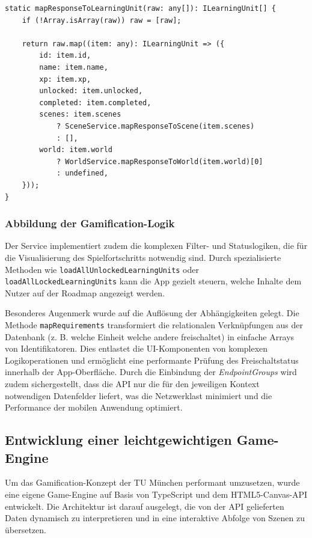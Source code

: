 \begin{verbatim}
static mapResponseToLearningUnit(raw: any[]): ILearningUnit[] {
    if (!Array.isArray(raw)) raw = [raw];

    return raw.map((item: any): ILearningUnit => ({
        id: item.id,
        name: item.name,
        xp: item.xp,
        unlocked: item.unlocked,
        completed: item.completed,
        scenes: item.scenes 
            ? SceneService.mapResponseToScene(item.scenes) 
            : [],
        world: item.world 
            ? WorldService.mapResponseToWorld(item.world)[0] 
            : undefined,
    }));
}
\end{verbatim}

\subsubsection{Abbildung der Gamification-Logik}
Der Service implementiert zudem die komplexen Filter- und Statuslogiken, die für die Visualisierung des Spielfortschritts notwendig sind. Durch spezialisierte Methoden wie 
\texttt{loadAll\-Unlocked\-Learning\-Units} oder \texttt{loadAllLockedLearningUnits} kann die App gezielt steuern, welche Inhalte dem Nutzer auf der Roadmap angezeigt werden. 

Besonderes Augenmerk wurde auf die Auflösung der Abhängigkeiten gelegt. Die Methode \texttt{mapRequirements} transformiert die relationalen Verknüpfungen aus der Datenbank 
(z. B. welche Einheit welche andere freischaltet) in einfache Arrays von Identifikatoren. Dies entlastet die UI-Komponenten von komplexen Logikoperationen und ermöglicht eine 
performante Prüfung des Freischaltstatus innerhalb der App-Oberfläche. Durch die Einbindung der \textit{EndpointGroups} wird zudem sichergestellt, dass die API nur die für den 
jeweiligen Kontext notwendigen Datenfelder liefert, was die Netzwerklast minimiert und die Performance der mobilen Anwendung optimiert.

\subsection{Entwicklung einer leichtgewichtigen Game-Engine}

Um das Gamification-Konzept der TU München performant umzusetzen, wurde eine eigene Game-Engine auf Basis von TypeScript und dem HTML5-Canvas-API entwickelt. Die Architektur ist 
darauf ausgelegt, die von der API gelieferten Daten dynamisch zu interpretieren und in eine interaktive Abfolge von Szenen zu übersetzen.

